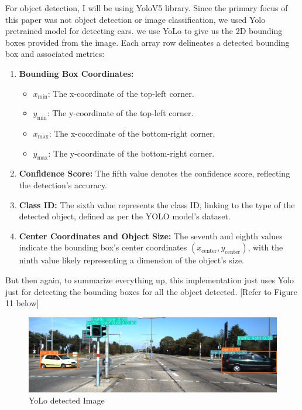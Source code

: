 \documentclass[letterpaper, 10 pt, conference]{ieeeconf}  %
\begin{document}
For object detection, I will be using YoloV5 library. Since the primary focus of this paper was not object detection or image classification, we used Yolo pretrained model for detecting cars.
we use YoLo to give us the 2D bounding boxes provided from the image. Each array row delineates a detected bounding box and associated metrics:
\begin{enumerate}
    \item \textbf{Bounding Box Coordinates:}
    \begin{itemize}
        \item \(x_{\min}\): The x-coordinate of the top-left corner.
        \item \(y_{\min}\): The y-coordinate of the top-left corner.
        \item \(x_{\max}\): The x-coordinate of the bottom-right corner.
        \item \(y_{\max}\): The y-coordinate of the bottom-right corner.
    \end{itemize}
    
    \item \textbf{Confidence Score:}
    The fifth value denotes the confidence score, reflecting the detection's accuracy.
    
    \item \textbf{Class ID:}
    The sixth value represents the class ID, linking to the type of the detected object, defined as per the YOLO model's dataset.
    
    \item \textbf{Center Coordinates and Object Size:}
    The seventh and eighth values indicate the bounding box's center coordinates \((x_{\text{center}}, y_{\text{center}})\), with the ninth value likely representing a dimension of the object's size.
\end{enumerate}

But then again, to summarize everything up, this implementation just uses Yolo just for detecting the bounding boxes for all the object detected. [Refer to Figure 11 below]

\begin{figure}[htbp]
  \centering
  \includegraphics[width=\linewidth]{YoloDetectedImage.png}
  \caption{YoLo detected Image}
  \label{YoLo detected Image}
\end{figure}
\end{document}
